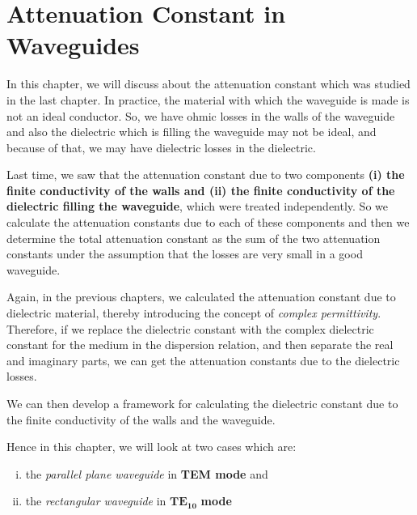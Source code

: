 \chapter{Attenuation Constant in Waveguides}
In this chapter, we will discuss about the attenuation constant which was studied in the last chapter. In practice, the material with which the waveguide is made is not an ideal conductor. So, we have ohmic losses in the walls of the waveguide and also the dielectric which is filling the waveguide may not be ideal, and because of that, we may have dielectric losses in the dielectric.

Last time, we saw that the attenuation constant due to two components \textbf{(i) the finite conductivity of the walls and (ii) the finite conductivity of the dielectric filling the waveguide}, which were treated independently. So we calculate the attenuation constants due to each of these components and then we determine the total attenuation constant as the sum of the two attenuation constants under the assumption that the losses are very small in a good waveguide.

Again, in the previous chapters, we calculated the attenuation constant due to dielectric material, thereby introducing the concept of \emph{complex permittivity}. Therefore, if we replace the dielectric constant with the complex dielectric constant for the medium in the dispersion relation, and then separate the real and imaginary parts, we can get the attenuation constants due to the dielectric losses.

We can then develop a framework for calculating the dielectric constant due to the finite conductivity of the walls and the waveguide.

Hence in this chapter, we will look at two cases which are:
\begin{enumerate}[(i)]
\item the \emph{parallel plane waveguide} in \textbf{TEM mode} and
\item the \emph{rectangular waveguide} in $\boldsymbol{TE_{10}}$ \textbf{mode}
\end{enumerate}

